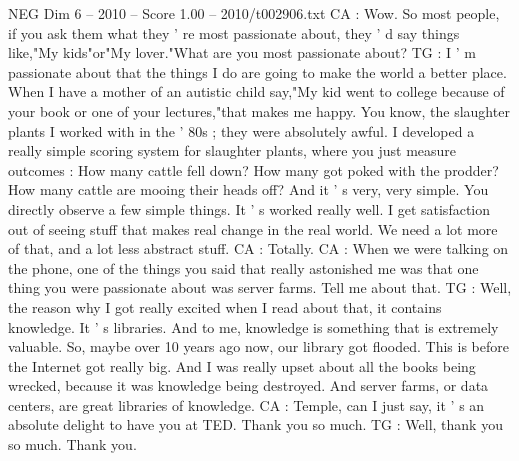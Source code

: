 \begin{textsample}{NEG Dim 6 – 2010 – Score 1.00 – 2010/t002906.txt}
CA : Wow.
So most people, if you ask them what they ' re most passionate about, they ' d say things like,"My kids"or"My lover."What are you most passionate about?
TG : I ' m passionate about that the things I do are going to make the world a better place.
When I have a mother of an autistic child say,"My kid went to college because of your book or one of your lectures,"that makes me happy.
You know, the slaughter plants I worked with in the ' 80s ; they were absolutely awful.
I developed a really simple scoring system for slaughter plants, where you just measure outcomes : How many cattle fell down?
How many got poked with the prodder?
How many cattle are mooing their heads off?
And it ' s very, very simple.
You directly observe a few simple things.
It ' s worked really well.
I get satisfaction out of seeing stuff that makes real change in the real world.
We need a lot more of that, and a lot less abstract stuff.
CA : Totally.
CA : When we were talking on the phone, one of the things you said that really astonished me was that one thing you were passionate about was server farms.
Tell me about that.
TG : Well, the reason why I got really excited when I read about that, it contains knowledge.
It ' s libraries.
And to me, knowledge is something that is extremely valuable.
So, maybe over 10 years ago now, our library got flooded.
This is before the Internet got really big.
And I was really upset about all the books being wrecked, because it was knowledge being destroyed.
And server farms, or data centers, are great libraries of knowledge.
CA : Temple, can I just say, it ' s an absolute delight to have you at TED.
Thank you so much.
TG : Well, thank you so much.
Thank you.

\end{textsample}
